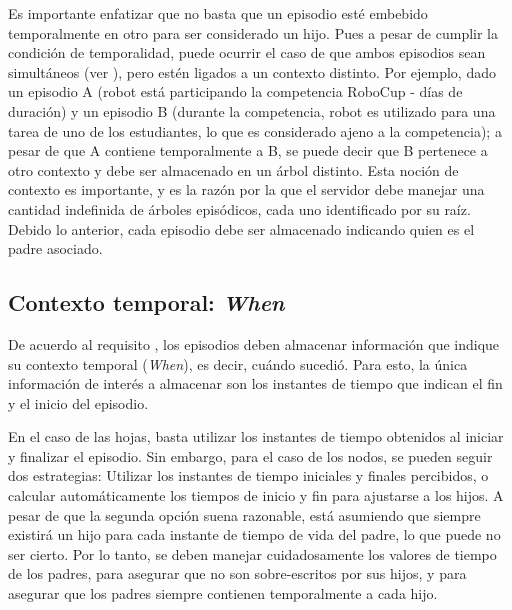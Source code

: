 Es importante enfatizar que no basta que un episodio esté embebido temporalmente en otro para ser considerado un hijo. Pues a pesar de cumplir la condición de temporalidad, puede ocurrir el caso de que ambos episodios sean simultáneos (ver ), pero estén ligados a un contexto distinto. Por ejemplo, dado un episodio A (robot está participando la competencia RoboCup - días de duración) y un episodio B (durante la competencia, robot es utilizado para una tarea de uno de los estudiantes, lo que es considerado ajeno a la competencia); a pesar de que A contiene temporalmente a B, se puede decir que B pertenece a otro contexto y debe ser almacenado en un árbol distinto. Esta noción de contexto es importante, y es la razón por la que el servidor debe manejar una cantidad indefinida de árboles episódicos, cada uno identificado por su raíz. Debido lo anterior, cada episodio debe ser almacenado indicando quien es el padre asociado.



\subsection{Contexto temporal: \textit{When}}\label{sec:design_ep_when}

De acuerdo al requisito , los episodios deben almacenar información que indique su contexto temporal (\textit{When}), es decir, cuándo  sucedió. Para esto, la única información de interés a almacenar son los instantes de tiempo que indican el fin y el inicio del episodio.

En el caso de las hojas, basta utilizar los instantes de tiempo obtenidos al iniciar y finalizar el episodio. Sin embargo, para el caso de los nodos, se pueden seguir dos estrategias: Utilizar los instantes de tiempo iniciales y finales percibidos, o calcular automáticamente los tiempos de inicio y fin para ajustarse a los hijos. A pesar de que la segunda opción suena razonable, está asumiendo que siempre existirá un hijo para cada instante de tiempo de vida del padre, lo que puede no ser cierto. Por lo tanto, se deben manejar cuidadosamente los valores de tiempo de los padres, para asegurar que no son sobre-escritos por sus hijos, y para asegurar que los padres siempre contienen temporalmente a cada hijo.


